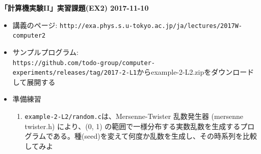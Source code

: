 \documentclass[11pt]{jarticle}
\begin{document}
\noindent
{\bf\large 「計算機実験II」実習課題(EX2) 2017-11-10}
\\[-0.5em]

\noindent
\begin{itemize}
\item 講義のページ: \verb+http://exa.phys.s.u-tokyo.ac.jp/ja/lectures/2017W-computer2+

\item サンプルプログラム: \\ {\small \verb+https://github.com/todo-group/computer-experiments/releases/tag/2017-2-L1+}からexample-2-L2.zipをダウンロードして展開する

\item 準備練習
  
  \begin{enumerate}
  \item {\tt example-2-L2/random.c}は、Mersenne-Twister 乱数発生器 (mersenne twister.h) により、(0, 1) の範囲で一様分布する実数乱数を生成するプログラムである。種(seed)を変えて何度か乱数を生成し、その時系列を比較してみよ
  \end{enumerate}


\end{itemize}
\end{document}
